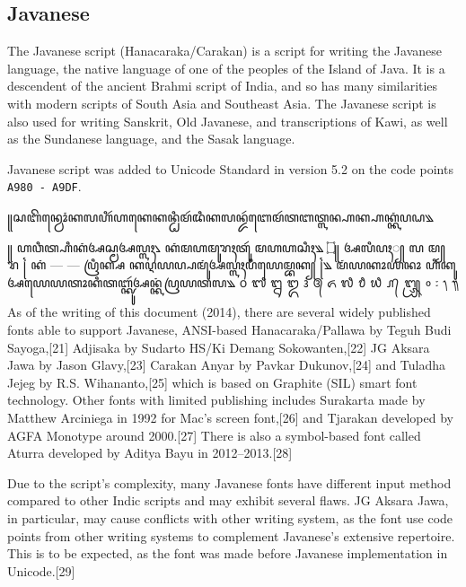 \subsection{Javanese}

The Javanese script (Hanacaraka/Carakan) is a script for writing the Javanese language, the native language of one of the peoples of the Island of Java. It is a descendent of the ancient Brahmi script of India, and so has many similarities with modern scripts of South Asia and Southeast Asia. The Javanese script is also used for writing Sanskrit, Old Javanese, and transcriptions of Kawi, as well as the Sundanese language, and the Sasak language.

Javanese script was added to Unicode Standard in version 5.2 on the code points \texttt{A980 - A9DF}.


\newfontfamily{}

\newfontfamily{}

\begin{scriptexample}
\bgroup
\javanese

꧋ꦱꦧꦼꦤ꧀ꦮꦺꦴꦁꦏꦭꦲꦶꦂꦲꦏꦺꦏꦤ꧀ꦛꦶꦩꦂꦢꦶꦏꦭꦤ꧀ꦢꦂꦧꦺꦩꦂꦠꦧꦠ꧀ꦭꦤ꧀ꦲꦏ꧀ꦲꦏ꧀ꦏꦁꦥꦝ꧉

꧋ ꦲꦮꦶꦠ꧀ꦲꦶꦏꦁꦄꦱ꧀ꦩꦄꦭ꧀ꦭꦃ꧈ ꦏꦁꦩꦲꦩꦸꦫꦃꦠꦸꦂ ꦩꦲꦲꦱꦶꦃ꧉ 	 
 ۝꧋ ꦄꦭꦶꦥꦃ꧀ ꦭ ꦩ꧀ ꦫ ꧌ ꦏꦁ — — ꦥꦿꦶꦏ꧀ꦱ ꦏꦉꦪꦥ꧀ꦥꦩꦸꦁꦄꦭ꧀ꦭꦃꦥꦶꦪꦺꦩ꧀ꦧꦏ꧀ ꧌꧉ ꦩꦁꦪꦏꦴꦪꦤꦴ ꦲꦶꦏꦸꦄꦪꦺꦪꦠꦴꦏꦶꦠꦧ꧀ꦑꦸꦂꦄꦤ꧀ꦏꦁꦥꦿꦪꦠꦭ꧉ 	 
᭐	᭑	᭒	᭓	᭔	᭕	᭖	᭗	᭘	᭙	᭚	᭛	᭜	᭝	᭞	᭟

 
\egroup
\end{scriptexample}

As of the writing of this document (2014), there are several widely published fonts able to support Javanese, ANSI-based Hanacaraka/Pallawa by Teguh Budi Sayoga,[21] Adjisaka by Sudarto HS/Ki Demang Sokowanten,[22] JG Aksara Jawa by Jason Glavy,[23] Carakan Anyar by Pavkar Dukunov,[24] and Tuladha Jejeg by R.S. Wihananto,[25] which is based on Graphite (SIL) smart font technology. Other fonts with limited publishing includes Surakarta made by Matthew Arciniega in 1992 for Mac's screen font,[26] and Tjarakan developed by AGFA Monotype around 2000.[27] There is also a symbol-based font called Aturra developed by Aditya Bayu in 2012–2013.[28]

Due to the script's complexity, many Javanese fonts have different input method compared to other Indic scripts and may exhibit several flaws. JG Aksara Jawa, in particular, may cause conflicts with other writing system, as the font use code points from other writing systems to complement Javanese's extensive repertoire. This is to be expected, as the font was made before Javanese implementation in Unicode.[29]

